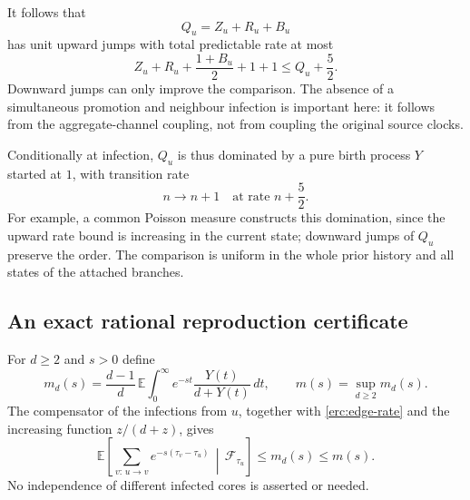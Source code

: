 It follows that
\[
 Q_u=Z_u+R_u+B_u
\]
has unit upward jumps with total predictable rate at most
\begin{equation}\label{erc:reservoir-rate}
 Z_u+R_u+\frac{1+B_u}{2}+1+1
 \le Q_u+\frac52.
\end{equation}
Downward jumps can only improve the comparison.  The absence of a
simultaneous promotion and neighbour infection is important here:
it follows from the aggregate-channel coupling, not from coupling
the original source clocks.

Conditionally at infection, $Q_u$ is thus dominated by a pure birth
process $Y$ started at $1$, with transition rate
\begin{equation}\label{erc:dominating-chain}
 n\longrightarrow n+1\quad\text{at rate }n+\frac52.
\end{equation}
For example, a common Poisson measure constructs this domination,
since the upward rate bound is increasing in the current state;
downward jumps of $Q_u$ preserve the order.  The comparison is uniform
in the whole prior history and all states of the attached branches.

\subsection{An exact rational reproduction certificate}

For $d\ge2$ and $s>0$ define
\begin{equation}\label{erc:mass}
 m_d(s)=\frac{d-1}{d}\,
 \mathbb E\int_0^\infty e^{-st}\frac{Y(t)}{d+Y(t)}\,dt,
 \qquad m(s)=\sup_{d\ge2}m_d(s).
\end{equation}
The compensator of the infections from $u$, together with
\eqref{erc:edge-rate} and the increasing function $z/(d+z)$, gives
\begin{equation}\label{erc:offspring}
 \mathbb E\left[
   \sum_{v:\,u\to v}e^{-s(\tau_v-\tau_u)}
      \,\middle|\,\mathcal F_{\tau_u}\right]
 \le m_d(s)\le m(s).
\end{equation}
No independence of different infected cores is asserted or needed.

